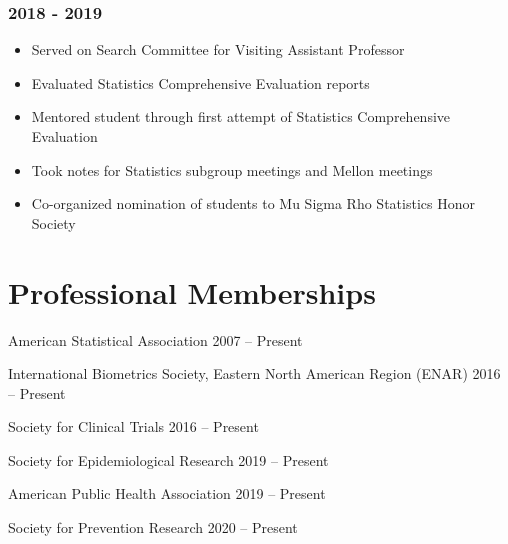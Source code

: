 \documentclass[
  fleqn, oneside]{article}
\providecommand{\tightlist}{%
  \setlength{\itemsep}{0pt}\setlength{\parskip}{0pt}}
\begin{document}
\hypertarget{section-2}{%
\subsubsection{2018 - 2019}\label{section-2}}

\begin{itemize}
\tightlist
\item
  Served on Search Committee for Visiting Assistant Professor
\item
  Evaluated Statistics Comprehensive Evaluation reports
\item
  Mentored student through first attempt of Statistics Comprehensive
  Evaluation
\item
  Took notes for Statistics subgroup meetings and Mellon meetings
\item
  Co-organized nomination of students to Mu Sigma Rho Statistics Honor
  Society
\end{itemize}

\hypertarget{professional-memberships}{%
\section{Professional Memberships}\label{professional-memberships}}

American Statistical Association \hfill 2007 -- Present

International Biometrics Society, Eastern North American Region (ENAR)
\hfill 2016 -- Present

Society for Clinical Trials \hfill 2016 -- Present

Society for Epidemiological Research \hfill 2019 -- Present

American Public Health Association \hfill 2019 -- Present

Society for Prevention Research \hfill 2020 -- Present
\end{document}

